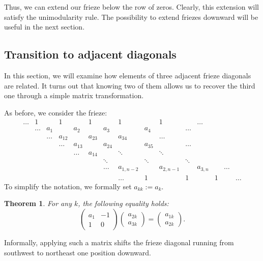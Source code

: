 \documentclass[a4paper,11pt]{amsart}
\theoremstyle{plain}
\newtheorem{theorem}{Theorem}[section]
\theoremstyle{remark}
\theoremstyle{definition}
\numberwithin{equation}{section}
\numberwithin{figure}{section}
\begin{document}
Thus, we can extend our frieze below the row of zeros. Clearly, this extension will satisfy the unimodularity rule. The possibility to extend friezes downward will be useful in the next section.

\subsection{Transition to adjacent diagonals} In this section, we will examine how elements of three adjacent frieze diagonals are related. It turns out that knowing two of them allows us to recover the third  one through a simple matrix transformation.

As before, we consider the frieze:
\begin{equation*}%
\begin{array}{ccccccccccccccccccccc}
\dots &1 && 1&& 1&& 1&&1&&\dots\\
&\dots & a_1 && a_2  && a_3 &&a_4&&\dots\\
&&\dots & a_{12} &&a_{23}&& a_{34}&&\dots  \\
&&&\dots & a_{13} && a_{24}&& a_{35}&&\dots\\
&&&&\dots &a_{14}&&\ddots &&\ddots\\
&&&&&& \ddots &&\ddots &&\ddots\\
&&&&&&\dots & a_{1,n-2} && a_{2,n-1}&&a_{3,n}&&\dots \\
&&&&&&&\dots & 1 && 1&& 1 && \dots 
\end{array}
\end{equation*}
To simplify the notation, we formally set $a_{kk}:=a_k$.

\begin{theorem}\label{thm:matrixshift} For any $k$, the following equality holds:
\[
\begin{pmatrix}
    a_1 &-1 \\1 &0
\end{pmatrix}
\begin{pmatrix}
    a_{2k} \\a_{3k}
\end{pmatrix}=
\begin{pmatrix}
    a_{1k} \\a_{2k}
\end{pmatrix}.
\]

\end{theorem}

Informally, applying such a matrix shifts the frieze diagonal running from southwest to northeast one position downward.
\end{document}
